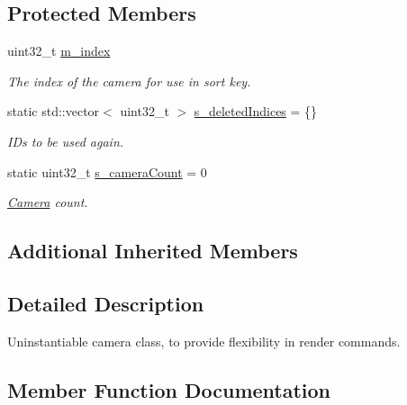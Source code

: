 \subsection*{Protected Members}
\begin{DoxyCompactItemize}
\item 
\mbox{\label{classrev_1_1_abstract_camera_a078fbfd582d21563610a1d9d51eee7b1}} 
uint32\+\_\+t \mbox{\hyperlink{classrev_1_1_abstract_camera_a078fbfd582d21563610a1d9d51eee7b1}{m\+\_\+index}}
\begin{DoxyCompactList}\small\item\em The index of the camera for use in sort key. \end{DoxyCompactList}\item 
\mbox{\label{classrev_1_1_abstract_camera_ad8df466912bfcc99bf4f570547b701cd}} 
static std\+::vector$<$ uint32\+\_\+t $>$ \mbox{\hyperlink{classrev_1_1_abstract_camera_ad8df466912bfcc99bf4f570547b701cd}{s\+\_\+deleted\+Indices}} = \{\}
\begin{DoxyCompactList}\small\item\em I\+Ds to be used again. \end{DoxyCompactList}\item 
\mbox{\label{classrev_1_1_abstract_camera_a8b88ab6d260c5f6f489c549b54264e13}} 
static uint32\+\_\+t \mbox{\hyperlink{classrev_1_1_abstract_camera_a8b88ab6d260c5f6f489c549b54264e13}{s\+\_\+camera\+Count}} = 0
\begin{DoxyCompactList}\small\item\em \mbox{\hyperlink{classrev_1_1_camera}{Camera}} count. \end{DoxyCompactList}\end{DoxyCompactItemize}
\subsection*{Additional Inherited Members}


\subsection{Detailed Description}
Uninstantiable camera class, to provide flexibility in render commands. 

\subsection{Member Function Documentation}
\mbox{\label{classrev_1_1_abstract_camera_a6dceba3b328d5e9c3543975e3ae370c0}} 
